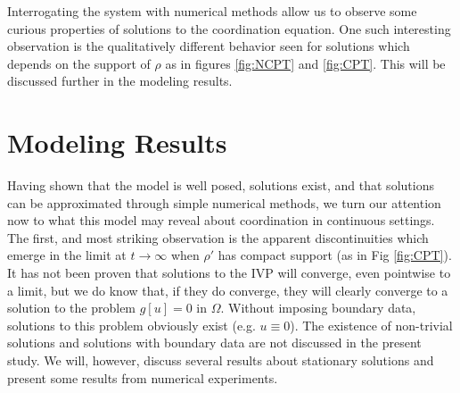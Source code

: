 \documentclass[aps,
preprint,
groupedaddress,
showkeys,
amsmath]{revtex4-2}
\begin{document}
    Interrogating the system with numerical methods allow us to observe some curious properties of solutions to the coordination equation. One such interesting observation is the qualitatively different behavior seen for solutions which depends on the support of $\rho$ as in figures \ref{fig:NCPT} and \ref{fig:CPT}. This will be discussed further in the modeling results. 

 \section{Modeling Results}\label{SEC:ModelingResults}
    Having shown that the model is well posed, solutions exist, and that solutions can be approximated through simple numerical methods, we turn our attention now to what this model may reveal about coordination in continuous settings. The first, and most striking observation is the apparent discontinuities which emerge in the limit at $t\to \infty$ when $\rho'$ has compact support (as in Fig \ref{fig:CPT}). It has not been proven that solutions to the IVP will converge, even pointwise to a limit, but we do know that, if they do converge, they will clearly converge to a solution to the problem $g[u]=0$ in $\Omega$. Without imposing boundary data, solutions to this problem obviously exist (e.g. $u\equiv 0$). The existence of non-trivial solutions and solutions with boundary data are not discussed in the present study. We will, however, discuss several results about stationary solutions and present some results from numerical experiments. 
\end{document}
